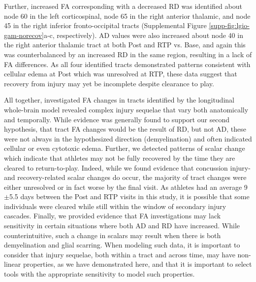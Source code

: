 \documentclass[12pt]{article}
\begin{document}
Further, increased FA corresponding with a decreased RD was identified about node 60 in the left corticospinal, node 65 in the right anterior thalamic, and node 45 in the right inferior fronto-occipital tracts (Supplemental Figure \ref{supp-fig:lgio-gam-norecov}a-c, respectively). AD values were also increased about node 40 in the right anterior thalamic tract at both Post and RTP vs. Base, and again this was counterbalanced by an increased RD in the same region, resulting in a lack of FA differences. As all four identified tracts demonstrated patterns consistent with cellular edema at Post which was unresolved at RTP, these data suggest that recovery from injury may yet be incomplete despite clearance to play.

All together, investigated FA changes in tracts identified by the longitudinal whole-brain model revealed complex injury sequelae that vary both anatomically and temporally. While evidence was generally found to support our second hypothesis, that tract FA changes would be the result of RD, but not AD, these were not always in the hypothesized direction (demyelination) and often indicated cellular or even cytotoxic edema. Further, we detected patterns of scalar change which indicate that athletes may not be fully recovered by the time they are cleared to return-to-play. Indeed, while we found evidence that concussion injury- and recovery-related scalar changes do occur, the majority of tract changes were either unresolved or in fact worse by the final visit. As athletes had an average 9$\pm$5.5 days between the Post and RTP visits in this study, it is possible that some individuals were cleared while still within the window of secondary injury cascades. Finally, we provided evidence that FA investigations may lack sensitivity in certain situations where both AD and RD have increased. While counterintuitive, such a change in scalars may result when there is both demyelination and glial scarring. When modeling such data, it is important to consider that injury sequelae, both within a tract and across time, may have non-linear properties, as we have demonstrated here, and that it is important to select tools with the appropriate sensitivity to model such properties.
\end{document}
